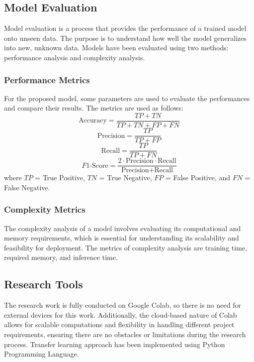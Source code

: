 \documentclass{ijcaArticle}
\begin{document}
\subsection{Model Evaluation}
Model evaluation is a process that provides the performance of a trained model onto unseen data. The purpose is to understand how well the model generalizes into new, unknown data. Models have been evaluated using two methods: performance analysis and complexity analysis.

\subsubsection{Performance Metrics}
For the proposed model, some parameters are used to evaluate the performances and compare their results. The metrics are used as follows:
\begin{equation}
    \text{Accuracy} = \frac{TP + TN}{TP + TN + FP + FN}
    \label{eq:accuracy}
\end{equation}
\begin{equation}
    \text{Precision} = \frac{TP}{TP + FP}
    \label{eq:precision}
\end{equation}
\begin{equation}
    \text{Recall} = \frac{TP}{TP + FN}
    \label{eq:recall}
\end{equation}
\begin{equation}
    F1\text{-Score} = \frac{2 \cdot \text{Precision} \cdot \text{Recall}}{\text{Precision} + \text{Recall}}
    \label{eq:f1score}
\end{equation}
where $TP$ = True Positive, $TN$ = True Negative, $FP$ = False Positive, and $FN$ = False Negative.

\subsubsection{Complexity Metrics}
The complexity analysis of a model involves evaluating its computational and memory requirements, which is essential for understanding its scalability and feasibility for deployment. The metrics of complexity analysis are training time, required memory, and inference time.

\subsection{Research Tools}
The research work is fully conducted on Google Colab, so there is no need for external devices for this work. Additionally, the cloud-based nature of Colab allows for scalable computations and flexibility in handling different project requirements, ensuring there are no obstacles or limitations during the research process. Transfer learning approach has been implemented using Python Programming Language.
\end{document}
